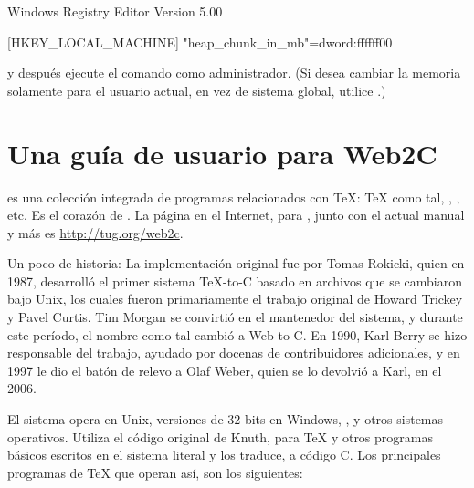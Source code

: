 \documentclass{article}
\begin{document}
\begin{sverbatim}
Windows Registry Editor Version 5.00

[HKEY_LOCAL_MACHINE\Software\Cygwin]
"heap_chunk_in_mb"=dword:ffffff00   
\end{sverbatim}

\noindent y después ejecute el comando  como
administrador. (Si desea cambiar la memoria solamente para el usuario
actual, en vez de sistema global, utilice .)

\section{Una guía de usuario para Web2C}

\Webc{} es una colección integrada de programas relacionados con \TeX{}:
\TeX{} como tal, \MP{}, \BibTeX{}, etc. Es el corazón de \TL{}. La
página en el Internet, para \Webc{}, junto con el actual manual y más es
\url{http://tug.org/web2c}.

Un poco de historia: La implementación original fue por Tomas Rokicki,
quien en 1987, desarrolló el primer sistema \TeX{}-to-C basado en archivos
que se cambiaron bajo Unix, los cuales fueron primariamente el trabajo
original de Howard Trickey y Pavel Curtis. Tim Morgan se convirtió en el
mantenedor del sistema, y durante este período, el nombre como tal cambió
a Web-to-C\@. En 1990, Karl Berry se hizo responsable del trabajo, ayudado
por docenas de contribuidores adicionales, y en 1997 le dio el batón de
relevo a Olaf Weber, quien se lo devolvió a Karl, en el 2006.

El sistema \Webc{} opera en Unix, versiones de 32-bits en Windows,
\MacOSX{}, y otros sistemas operativos. Utiliza el código original de
Knuth, para \TeX{} y otros programas básicos escritos en el sistema
literal \web{} y los traduce, a código C. Los principales programas de
\TeX{} que operan así, son los siguientes:
\end{document}
